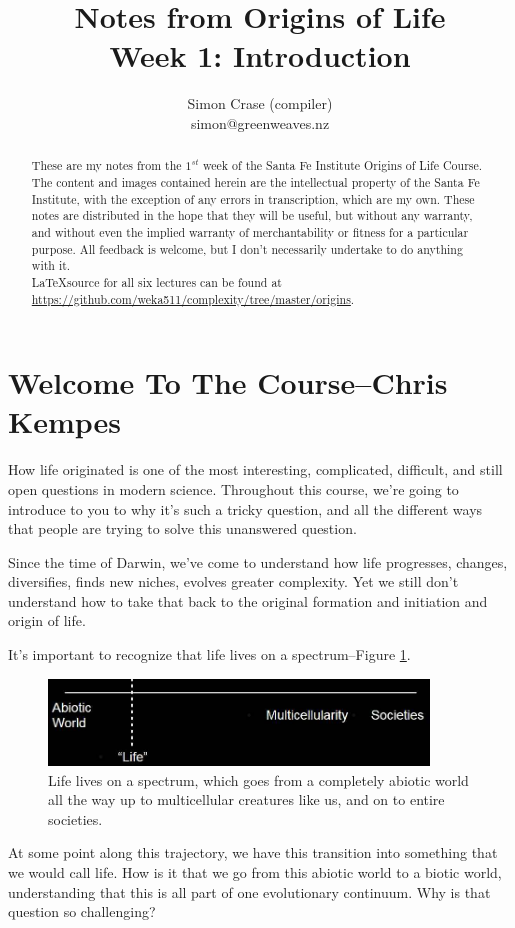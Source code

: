 \documentclass[]{article}
\title{
	Notes from Origins of Life\\
	Week 1: Introduction
}
\author{Simon Crase (compiler)\\simon@greenweaves.nz}
\begin{document}
\maketitle

\begin{abstract}
    These are my notes from the $1^{st}$ week of the Santa Fe Institute Origins of Life Course\cite{sfi2020}.\\
    The content and images contained herein are the intellectual property of the Santa Fe Institute, with the exception of any errors in transcription, which are my own.
    These notes are distributed in the hope that they will be useful, but without any warranty, and without even the implied warranty of  merchantability or fitness for a particular purpose. All feedback is welcome,  but I don't necessarily undertake to do anything with it.\\
    \LaTeX source for all six lectures can be found at\\
    \url{https://github.com/weka511/complexity/tree/master/origins}.
\end{abstract}

\setcounter{tocdepth}{2}
\tableofcontents
\listoffigures

\section[Welcome To The Course]{Welcome To The Course--Chris Kempes}

How life originated is one of the most interesting, complicated, difficult, and still open questions in modern science. Throughout this course, we're going to
introduce to you to why it's such a tricky question, and all the different ways that people are trying to solve this unanswered question.	

Since the time of Darwin, we've come to understand how life progresses, changes, diversifies, finds new niches, evolves greater complexity. Yet we still don't understand how to take that back to the original formation and initiation and origin of life.

It's important to recognize that life lives on a spectrum--Figure \ref{fig:lifesTransitions}.

\begin{figure}[H]
	\caption[Life lives on a spectrum]{Life lives on a spectrum, which goes from a completely abiotic world all the way up to multicellular creatures like us, and on to entire societies.}\label{fig:lifesTransitions}
	\includegraphics[width=0.9\textwidth]{lifesTransitions}
\end{figure}
At some point along this trajectory, we have this transition into something
that we would call life. How is it that we go from this
abiotic world to a biotic world, understanding that this is all part of one
evolutionary continuum. Why is that question so challenging?
\end{document}
